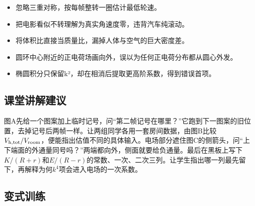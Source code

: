 \documentclass[UTF8,fontset=fandol,a4paper,11pt]{ctexart}
\begin{document}
\begin{itemize}
\item 忽略三重对称，按每帧整转一圈估计最低轮速。
\item 把电影看似不转理解为真实角速度零，违背汽车纯滚动。
\item 将体积比直接当质量比，漏掉人体与空气的巨大密度差。
\item 圆环中心附近的正电荷场画向外，误以为任何正电荷分布都从圆心外发。
\item 椭圆积分只保留k²，却在相消后提取更高阶系数，得到错误首项。
\end{itemize}



\subsection*{课堂讲解建议}

图A先给一个图案加上临时记号，问“第二帧记号在哪里？”它跑到下一图案的旧位置，去掉记号后两帧一样。让两组同学各用一套房间数据，由图B比较$V_{\rm h,tot}/V_{\rm room}$，便能指出估值不同的具体输入。电场部分遮住图C的侧箭头，问“上下端面的外通量同号吗？”两端都向外，侧面就要给负通量。最后在黑板上写下$K/(R+r)$和$E/(R-r)$的常数、一次、二次三列。让学生指出哪一列最先留下，再解释为何$k^4$项会进入电场的一次系数。



\subsection*{变式训练}
\end{document}
